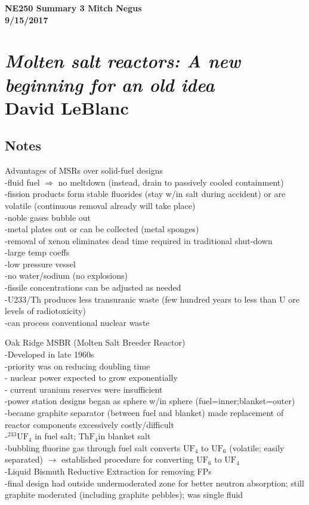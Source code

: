 \documentclass{report}
\newcommand{\tab}{\-\hspace{1cm}}
\begin{document}
\thispagestyle{empty}

{\bf {\large {NE250 Summary {3} \hfill Mitch Negus\\
		\hspace*{\fill} 9/15/2017\\ }}}
\section*{\textsl{Molten salt reactors: A new beginning for an old idea} \\ \normalsize David LeBlanc}

\subsection*{Notes}

Advantages of MSRs over solid-fuel designs\\
-fluid fuel $\Rightarrow$ no meltdown (instead, drain to passively cooled containment)\\
-fission products form stable fluorides (stay w/in salt during accident) or are volatile (continuous removal already will take place)\\
-noble gases bubble out\\
-metal plates out or can be collected (metal sponges)\\
-removal of xenon eliminates dead time required in traditional shut-down\\
-large temp coeffs\\
-low pressure vessel\\
-no water/sodium (no explosions)\\
-fissile concentrations can be adjusted as needed\\
-U233/Th produces less transuranic waste (few hundred years to less than U ore levels of radiotoxicity)\\
-can process conventional nuclear waste

Oak Ridge MSBR (Molten Salt Breeder Reactor)\\
-Developed in late 1960s\\
-priority was on reducing doubling time\\
\tab - nuclear power expected to grow exponentially\\
\tab - current uranium reserves were insufficient\\
-power station designs began as sphere w/in sphere (fuel=inner;blanket=outer)\\
-became graphite separator (between fuel and blanket) made replacement of reactor components excessively costly/difficult\\
-$^{233}\text{UF}_4$ in fuel salt; $\text{ThF}_4$in blanket salt\\
-bubbling fluorine gas through fuel salt converts $\text{UF}_4$ to $\text{UF}_6$ (volatile; easily separated) $\rightarrow$ established procedure for converting $\text{UF}_6$ to $\text{UF}_4$\\
-Liquid Bismuth Reductive Extraction for removing FPs\\
-final design had outside undermoderated zone for better neutron absorption; still graphite moderated (including graphite pebbles); was single fluid\\
\end{document}
